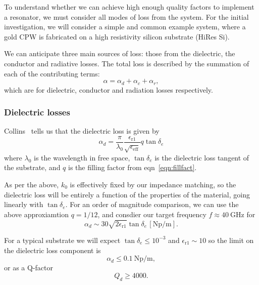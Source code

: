To understand whether we can achieve high enough quality factors to implement a
resonator, we must consider all modes of loss from the system. For the initial
investigation, we will consider a simple and common example system, where a gold
CPW is fabricated on a high resistivity silicon substrate (HiRes Si). 

We can anticipate three main sources of loss: those from the dielectric, the
conductor and radiative losses. \cite{Simons2004} The total loss is described
by the summation of each of the contributing terms:
\begin{equation}
  \alpha = \alpha_d + \alpha_c + \alpha_r,
\end{equation}
which are for dielectric, conductor and radiation losses respectively.

\subsubsection{Dielectric losses}

Collins~\cite{Collin2007} tells us that the dielectric loss is given by
\begin{equation}
  \alpha_d =
  \frac{\pi}{\lambda_0}\frac{\epsilon_\mathrm{r1}}{\sqrt{\epsilon_\mathrm{eff}}}
  q \tan \delta_e
\end{equation}
where $\lambda_0$ is the wavelength in free space, $\tan \delta_e$ is the
dielectric loss tangent of the substrate, and $q$ is the filling factor from
eqn~\ref{eqn:fillfact}.

As per the above, $k_0$ is effectively fixed by our impedance matching, so the
dielectric loss will be entirely a function of the properties of the material,
going linearly with $\tan\delta_e$. For an order of magnitude comparison, we can
use the above approxiamtion $q=1/12$, and consdier our target frequency
$f\approx\SI{40}{\giga\hertz}$ for
\begin{equation}
  \alpha_d \sim 30\sqrt{2\epsilon_\mathrm{r1}}\tan\delta_e
  \,[\si{\neper\per\meter}].
\end{equation}

For a typical substrate we will expect $\tan\delta_e\leq10^{-3}$ and
$\epsilon_\mathrm{r1} \sim 10$ so the limit on the dielectric loss component is
\begin{equation}
  \alpha_d \leq \SI{0.1}{\neper\per\meter},
\end{equation}
or as a Q-factor
\begin{equation}
  Q_d \geq 4000.
\end{equation}

